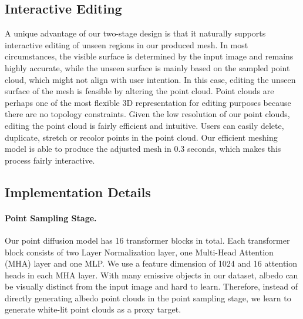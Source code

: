 \subsection{Interactive Editing}
A unique advantage of our two-stage design is that it naturally supports interactive editing of unseen regions in our produced mesh. In most circumstances, the visible surface is determined by the input image and remains highly accurate, while the unseen surface is mainly based on the sampled point cloud, which might not align with user intention. In this case, editing the unseen surface of the mesh is feasible by altering the point cloud. Point clouds are perhaps one of the most flexible 3D representation for editing purposes because there are no topology constraints. Given the low resolution of our point clouds, editing the point cloud is fairly efficient and intuitive. Users can easily delete, duplicate, stretch or recolor points in the point cloud. Our efficient meshing model is able to produce the adjusted mesh in 0.3 seconds, which makes this process fairly interactive. 

\subsection{Implementation Details}
\paragraph{Point Sampling Stage.}
Our point diffusion model has 16 transformer blocks in total. Each transformer block consists of two Layer Normalization layer, one Multi-Head Attention (MHA) layer and one MLP. We use a feature dimension of 1024 and 16 attention heads in each MHA layer. With many emissive objects in our dataset, albedo can be visually distinct from the input image and hard to learn. Therefore, instead of directly generating albedo point clouds in the point sampling stage, we learn to generate white-lit point clouds as a proxy target. 


